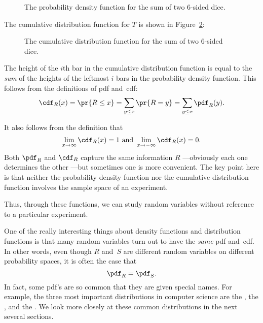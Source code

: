 \begin{figure}


\caption{The probability density function for the sum of two 6-sided
  dice.}

\label{fig:16F2}

\end{figure}

The cumulative distribution function for $T$ is shown in
Figure~\ref{fig:16F3}:
%
\begin{figure}


\caption{The cumulative distribution function for the sum of two
  6-sided dice.}

\label{fig:16F3}

\end{figure}
%
The height of the $i$th bar in the cumulative distribution function
is equal to the \emph{sum} of the heights of the leftmost $i$ bars
in the probability density function.  This follows from the
definitions of pdf and~cdf:
\[
\cdf_R(x)  = \pr{R \leq x}
           = \sum_{y \leq x} \pr{R = y}
           = \sum_{y \leq x} \pdf_R(y).
\]

\iffalse
\begin{align*}
\cdf_R(x) & = \pr{R \leq x} \\
          & = \sum_{y \leq x} \pr{R = y} \\
          & = \sum_{y \leq x} \pdf_R(y).
\end{align*}
\fi

It also follows from the definition that
\[\lim_{x \to \infty}\cdf_R(x) = 1 \text{  and  } \lim_{x \to -\infty}
\cdf_R(x) = 0.
\]
Both $\pdf_R$ and $\cdf_R$ capture the same information $R$
---obviously each one determines the other ---but sometimes one is
more convenient.  The key point here is that neither the probability
density function nor the cumulative distribution function involves the
sample space of an experiment.

\begin{editingnotes}
Thus, through these functions, we can study random variables without
reference to a particular experiment.
\end{editingnotes}

One of the really interesting things about density functions and
distribution functions is that many random variables turn out to have
the \emph{same} pdf and~cdf.  In other words, even though $R$ and~$S$
are different random variables on different probability spaces, it is
often the case that
\begin{equation*}
    \pdf_R = \pdf_S.
\end{equation*}
In fact, some pdf's are so common that they are given special names.
For example, the three most important distributions in computer
science are the , the , and the .  We look more
closely at these common distributions in the next several sections.

